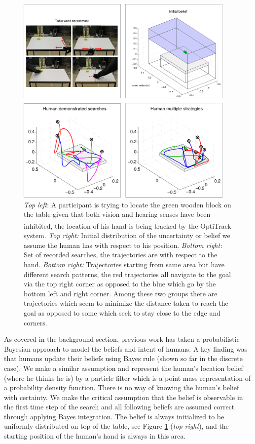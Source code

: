 \begin{figure}
\centering
  \includegraphics[width=0.95\textwidth]{./ch3-Search/Figures/Figure2}
  \caption{\textit{Top left}: A participant is trying to locate the green wooden block on the table
given that both vision and hearing senses have been inhibited, the location of his hand is being tracked by the
OptiTrack\textsuperscript{\textregistered} system. \textit{Top right:} Initial distribution of the uncertainty or belief we assume
the human has with respect to his position. \textit{Bottom right:} Set of recorded searches, the trajectories are with respect to the hand.
\textit{Bottom right:} Trajectories starting from same area but have different search patterns, the red trajectories all navigate to the goal
via the top right corner as opposed to the blue which go by the bottom left and right corner. Among these two groups there are trajectories which
seem to minimize the distance taken to reach the goal as opposed to some which seek to stay close to the edge and corners.}
\label{fig:experiment}
\end{figure}


As covered in the background section, previous work has taken a probabilistic Bayesian approach to model the beliefs and intent 
of humans. A key finding was that humans update their beliefs using Bayes rule (shown so far in the discrete case). 
We make a similar assumption and represent the human's location belief (where he thinks he is) by a particle filter which
is a point mass representation of a probability density function. There is no way of
knowing the human's belief with certainty. We make the critical assumption that the belief is observable in the first time step of the search and all following beliefs 
are assumed correct through applying Bayes integration.
The belief is always initialized to be uniformly distributed on top of the table, 
see Figure \ref{fig:experiment} (\textit{top right}), and the starting position of the human's hand is always in this area.

